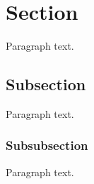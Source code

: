 



\section{Section} \label{section}

Paragraph text.




\subsection{Subsection} \label{subsection}

Paragraph text.




\subsubsection{Subsubsection} \label{subsubsection}

Paragraph text.

